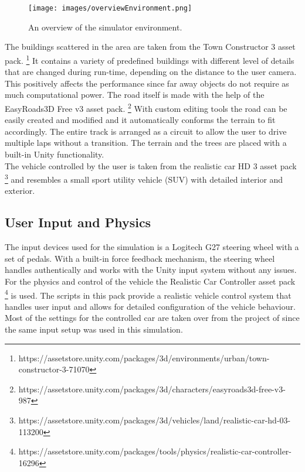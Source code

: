 \begin{figure}[h]
    \centering
	\texttt{[image: images/overviewEnvironment.png]}
	\caption[
		Simulator environment overview
	]{
		An overview of the simulator environment.
	}
	\label{figure:overviewEnvironment}
\end{figure}


The buildings scattered in the area are taken from the Town Constructor 3 asset pack. \footnote{https://assetstore.unity.com/packages/3d/environments/urban/town-constructor-3-71070}
It contains a variety of predefined buildings with different level of details that are changed during run-time, depending on the distance to the user camera.
This positively affects the performance since far away objects do not require as much computational power.
The road itself is made with the help of the EasyRoads3D Free v3 asset pack. \footnote{https://assetstore.unity.com/packages/3d/characters/easyroads3d-free-v3-987}
With custom editing tools the road can be easily created and modified and it automatically conforms the terrain to fit accordingly.
The entire track is arranged as a circuit to allow the user to drive multiple laps without a transition.
The terrain and the trees are placed with a built-in Unity functionality.
\\
The vehicle controlled by the user is taken from the realistic car HD 3 asset pack \footnote{https://assetstore.unity.com/packages/3d/vehicles/land/realistic-car-hd-03-113200} and resembles a small sport utility vehicle (SUV) with detailed interior and exterior. 

\subsection{User Input and Physics}
\label{subsection:input and physics}

The input devices used for the simulation is a Logitech G27 steering wheel with a set of pedals. 
With a built-in force feedback mechanism, the steering wheel handles authentically and works with the Unity input system without any issues.
For the physics and control of the vehicle the Realistic Car Controller asset pack \footnote{https://assetstore.unity.com/packages/tools/physics/realistic-car-controller-16296} is used.
The scripts in this pack provide a realistic vehicle control system that handles user input and allows for detailed configuration of the vehicle behaviour.
Most of the settings for the controlled car are taken over from the project of \textcite[]{birgmann2018simulation} since the same input setup was used in this simulation. 


